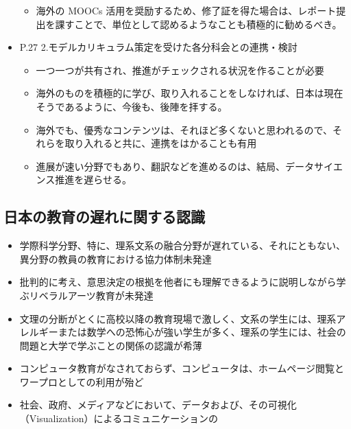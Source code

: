 \documentclass[
]{book}
\providecommand{\tightlist}{%
  \setlength{\itemsep}{0pt}\setlength{\parskip}{0pt}}
\theoremstyle{definition}
\theoremstyle{definition}
\theoremstyle{definition}
\theoremstyle{definition}
\theoremstyle{remark}
\begin{document}
\begin{itemize}
  \begin{itemize}
  \tightlist
  \item
    海外の MOOCs 活用を奨励するため、修了証を得た場合は、レポート提出を課すことで、単位として認めるようなことも積極的に勧めるべき。
  \end{itemize}
\item
  P.27 2.モデルカリキュラム策定を受けた各分科会との連携・検討

  \begin{itemize}
  \tightlist
  \item
    一つ一つが共有され、推進がチェックされる状況を作ることが必要
  \item
    海外のものを積極的に学び、取り入れることをしなければ、日本は現在そうであるように、今後も、後陣を拝する。
  \item
    海外でも、優秀なコンテンツは、それほど多くないと思われるので、それらを取り入れると共に、連携をはかることも有用
  \item
    進展が速い分野でもあり、翻訳などを進めるのは、結局、データサイエンス推進を遅らせる。
  \end{itemize}
\end{itemize}

\hypertarget{ux65e5ux672cux306eux6559ux80b2ux306eux9045ux308cux306bux95a2ux3059ux308bux8a8dux8b58-1}{%
\subsection{日本の教育の遅れに関する認識}\label{ux65e5ux672cux306eux6559ux80b2ux306eux9045ux308cux306bux95a2ux3059ux308bux8a8dux8b58-1}}

\begin{itemize}
\tightlist
\item
  学際科学分野、特に、理系文系の融合分野が遅れている、それにともない、異分野の教員の教育における協力体制未発達
\item
  批判的に考え、意思決定の根拠を他者にも理解できるように説明しながら学ぶリベラルアーツ教育が未発達
\item
  文理の分断がとくに高校以降の教育現場で激しく、文系の学生には、理系アレルギーまたは数学への恐怖心が強い学生が多く、理系の学生には、社会の問題と大学で学ぶことの関係の認識が希薄
\item
  コンピュータ教育がなされておらず、コンピュータは、ホームページ閲覧とワープロとしての利用が殆ど
\item
  社会、政府、メディアなどにおいて、データおよび、その可視化（Visualization）によるコミュニケーションの
\end{itemize}
\end{document}
